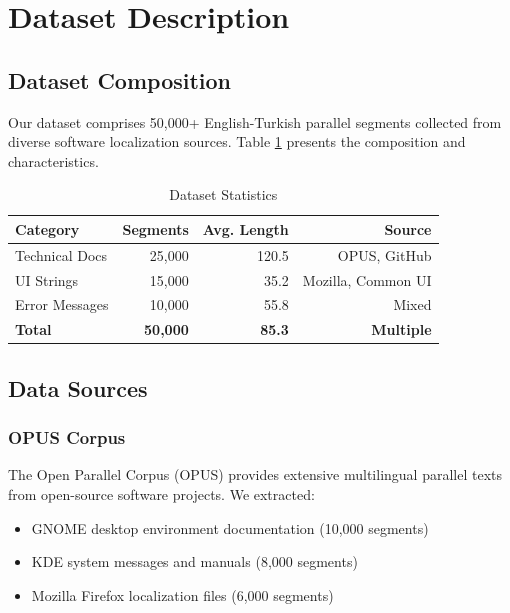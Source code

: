 \section{Dataset Description}

\subsection{Dataset Composition}

Our dataset comprises 50,000+ English-Turkish parallel segments collected from diverse software localization sources. Table \ref{tab:dataset_stats} presents the composition and characteristics.

\begin{table}[h]
\centering
\caption{Dataset Statistics}
\label{tab:dataset_stats}
\begin{tabular}{@{}lrrr@{}}
\toprule
\textbf{Category} & \textbf{Segments} & \textbf{Avg. Length} & \textbf{Source} \\ \midrule
Technical Docs & 25,000 & 120.5 & OPUS, GitHub \\
UI Strings & 15,000 & 35.2 & Mozilla, Common UI \\
Error Messages & 10,000 & 55.8 & Mixed \\ \midrule
\textbf{Total} & \textbf{50,000} & \textbf{85.3} & \textbf{Multiple} \\ \bottomrule
\end{tabular}
\end{table}

\subsection{Data Sources}

\subsubsection{OPUS Corpus}

The Open Parallel Corpus (OPUS) \cite{tiedemann2012parallel} provides extensive multilingual parallel texts from open-source software projects. We extracted:

\begin{itemize}
    \item GNOME desktop environment documentation (10,000 segments)
    \item KDE system messages and manuals (8,000 segments)
    \item Mozilla Firefox localization files (6,000 segments)
\end{itemize}

